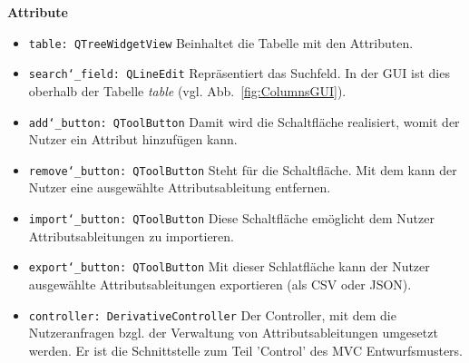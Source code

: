 \documentclass{article}
\newcommand{\guibutton}[1]{\fbox{\texttt{#1}}}
\begin{document}
\textbf{{Attribute}}
\begin{itemize}
\item \texttt{table: QTreeWidgetView} \newline Beinhaltet die Tabelle mit den Attributen.
\item \texttt{search\char`_field: QLineEdit} \newline Repräsentiert das Suchfeld. In der GUI ist dies oberhalb der Tabelle \textit{table} (vgl. Abb.~\ref{fig:ColumnsGUI}).
\item \texttt{add\char`_button: QToolButton} \newline Damit wird die \guibutton{+} Schaltfläche realisiert, womit der Nutzer ein Attribut hinzufügen kann. 
\item \texttt{remove\char`_button: QToolButton} \newline Steht für die \guibutton{-} Schaltfläche. Mit dem kann der Nutzer eine ausgewählte Attributsableitung entfernen. 
\item \texttt{import\char`_button: QToolButton} \newline Diese Schaltfläche emöglicht dem Nutzer Attributsableitungen zu importieren.
\item \texttt{export\char`_button: QToolButton} \newline Mit dieser Schlatfläche kann der Nutzer ausgewählte Attributsableitungen exportieren (als CSV oder JSON).
\item \texttt{controller: DerivativeController} \newline Der Controller, mit dem die Nutzeranfragen bzgl. der Verwaltung von Attributsableitungen umgesetzt werden. Er ist die Schnittstelle zum Teil 'Control' des MVC Entwurfsmusters.
\end{itemize}
\end{document}
